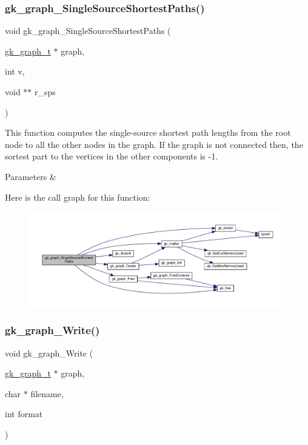 \subsubsection{\texorpdfstring{gk\+\_\+graph\+\_\+\+Single\+Source\+Shortest\+Paths()}{gk\_graph\_SingleSourceShortestPaths()}}
{\footnotesize\ttfamily void gk\+\_\+graph\+\_\+\+Single\+Source\+Shortest\+Paths (\begin{DoxyParamCaption}\item[{\hyperlink{a00638}{gk\+\_\+graph\+\_\+t} $\ast$}]{graph,  }\item[{int}]{v,  }\item[{void $\ast$$\ast$}]{r\+\_\+sps }\end{DoxyParamCaption})}

This function computes the single-\/source shortest path lengths from the root node to all the other nodes in the graph. If the graph is not connected then, the sortest part to the vertices in the other components is -\/1.


\begin{DoxyParams}{Parameters}
{\em } & \\
\hline
\end{DoxyParams}
Here is the call graph for this function\+:\nopagebreak
\begin{figure}[H]
\begin{center}
\leavevmode
\includegraphics[width=350pt]{a00077_a4726366ef9bb2ef6a202d0fae0b60b3f_cgraph}
\end{center}
\end{figure}
\mbox{\label{a00077_a92bfa3f7bc76f9fb591ad67f665383e9}} 
\subsubsection{\texorpdfstring{gk\+\_\+graph\+\_\+\+Write()}{gk\_graph\_Write()}}
{\footnotesize\ttfamily void gk\+\_\+graph\+\_\+\+Write (\begin{DoxyParamCaption}\item[{\hyperlink{a00638}{gk\+\_\+graph\+\_\+t} $\ast$}]{graph,  }\item[{char $\ast$}]{filename,  }\item[{int}]{format }\end{DoxyParamCaption})}

